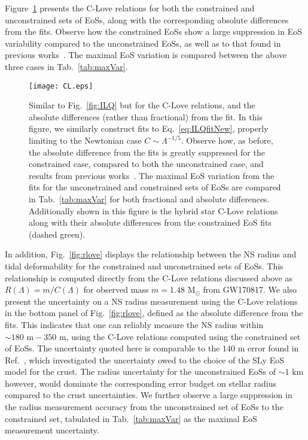 \documentclass[prd,twocolumn,nofootinbib,superscriptaddress,amsmath,amssymb]{revtex4-1}
\begin{document}
Figure~\ref{fig:clove} presents the C-Love relations for both the constrained and unconstrained sets of EoSs, along with the corresponding absolute differences from the fits. 
Observe how the constrained EoSs show a large suppression in EoS variability compared to the unconstrained EoSs, as well as to that found in previous works~\cite{Yagi:binLove}.
The maximal EoS variation is compared between the above three cases in Tab.~\ref{tab:maxVar}.
\begin{figure}
\begin{center} 
\texttt{[image: CL.eps]}
\end{center}
\caption{
Similar to Fig.~\ref{fig:ILQ} but for the C-Love relations, and the absolute differences (rather than fractional) from the fit.
In this figure, we similarly construct fits to  Eq.~\ref{eq:ILQfitNew}, properly limiting to the Newtonian case $C \sim \Lambda^{-1/5}$.
Observe how, as before, the absolute difference from the fits is greatly suppressed for the constrained case, compared to both the unconstrained case, and results from previous works~\cite{Yagi:binLove}.
The maximal EoS variation from the fits for the unconstrained and constrained sets of EoSs are compared in Tab.~\ref{tab:maxVar} for both fractional and absolute differences.
Additionally shown in this figure is the hybrid star C-Love relations along with their absolute differences from the constrained EoS fits (dashed green).
}
\label{fig:clove}
\end{figure} 

In addition, Fig.~\ref{fig:rlove} displays the relationship between the NS radius and tidal deformability for the constrained and unconstrained sets of EoSs.
This relationship is computed directly from the C-Love relations discussed above as $R(\Lambda)=m/C(\Lambda)$ for observed mass $m=1.48\text{ M}_{\odot}$ from GW170817.
We also present the uncertainty on a NS radius measurement using the C-Love relations in the bottom panel of Fig.~\ref{fig:rlove}, defined as the absolute difference from the fits.
This indicates that one can reliably measure the NS radius within $\sim 180 \text{ m} -350$ m, using the C-Love relations computed using the constrained set of EoSs.
The uncertainty quoted here is comparable to the $140\text{ m}$ error found in Ref.~\cite{Gamba:2019kwu}, which investigated the uncertainty owed to the choice of the SLy EoS model for the crust.
The radius uncertainty for the unconstrained EoSs of $\sim1\text{ km}$ however, would dominate the corresponding error budget on stellar radius compared to the crust uncertainties.
We further observe a large suppression in the radius measurement accuracy from the unconstrained set of EoSs to the constrained set, tabulated in Tab.~\ref{tab:maxVar} as the maximal EoS measurement uncertainty.
\end{document}
